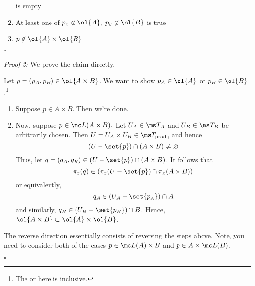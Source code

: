 \documentclass{fkpset}
\newcommand{\tprod}{\ensuremath \ms T_{\rm prod}}
\begin{document}
\begin{solution}
\begin{leftbar}
\begin{adjustwidth}{.025\linewidth}{.025\linewidth}
\begin{boxedminipage}{\linewidth}
\begin{enumerate}[label=(\arabic*)]
              is empty
            \item At least one of $p_x \not \in \ol{A},\ p_y \not \in
              \ol{B}$ is true
            \item $p \not \in \ol{A} \times \ol{B}$
          \end{enumerate}
          \hfill $\square$
        \end{boxedminipage}
      \end{adjustwidth}
      \begin{adjustwidth}{.025\linewidth}{.025\linewidth}
        \color{TealBlue}
        \begin{boxedminipage}{\linewidth}
          \emph{Proof 2:} We prove the claim directly.
          \begin{seteqproof}
            \item Let $p = (p_A, p_B) \in \ol{A \times B}$. We want to
              show $p_A \in \ol{A}$ or $p_B \in \ol{B}$.\footnote{The
                or here is inclusive.}
              \begin{enumerate}[label=(\arabic*)]
                \item Suppose $p \in A \times B$. Then we're done.
                  \cmark
                \item Now, suppose $p \in \mc L(A \times B).$ Let $U_A
                  \in \ms T_A$ and $U_B \in \ms T_B$ be arbitrarily
                  chosen. Then $U = U_A \times U_B \in \tprod$, and
                  hence
                  \[
                    (U - \set{p}) \cap (A \times B) \neq \varnothing
                  \]
                  Thus, let $q = (q_A, q_B) \in (U - \set{p}) \cap (A
                  \times B)$. It follows that
                  \[
                    \pi_x(q) \in (\pi_x(U - \set{p}) \cap \pi_x(A
                    \times B))
                  \]
                  or equivalently,
                  \[
                    q_A \in (U_A - \set{p_A}) \cap A
                  \]
                  and similarly, $q_B \in (U_B - \set{p_B}) \cap B$.
                  Hence, $\ol{A \times B} \subset \ol{A} \times
                  \ol{B}$. \cmark
              \end{enumerate}
            \item The reverse direction essentially consists of
              reversing the steps above. Note, you need to consider
              both of the cases $p \in \mc L(A) \times B$ and $p \in A
              \times \mc L(B)$.
          \end{seteqproof}
          \hfill $\square$

\end{boxedminipage}
\end{adjustwidth}
\end{leftbar}
\end{solution}
\end{document}
